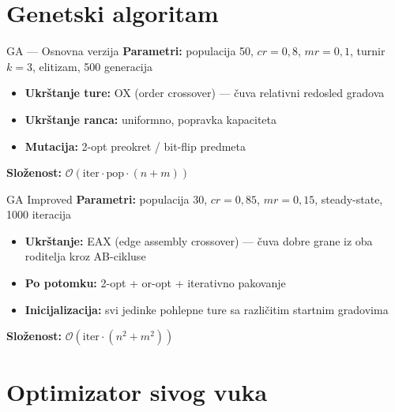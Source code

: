\documentclass[aspectratio=169]{beamer}
\begin{document}
\section{Genetski algoritam}

\begin{frame}{GA --- Osnovna verzija}
  \textbf{Parametri:} populacija 50, $cr = 0{,}8$, $mr = 0{,}1$, turnir $k=3$, elitizam, 500 generacija

  \bigskip
  \begin{itemize}
    \item \textbf{Ukrštanje ture:} OX (order crossover) --- čuva relativni redosled gradova
    \item \textbf{Ukrštanje ranca:} uniformno, popravka kapaciteta
    \item \textbf{Mutacija:} 2-opt preokret / bit-flip predmeta
  \end{itemize}

  \bigskip
  \textbf{Složenost:} $\mathcal{O}(\text{iter} \cdot \text{pop} \cdot (n + m))$
\end{frame}

\begin{frame}{GA Improved}
  \textbf{Parametri:} populacija 30, $cr = 0{,}85$, $mr = 0{,}15$, steady-state, 1000 iteracija

  \bigskip
  \begin{itemize}
    \item \textbf{Ukrštanje:} EAX (edge assembly crossover) ---
      čuva dobre grane iz oba roditelja kroz AB-cikluse
    \item \textbf{Po potomku:} 2-opt + or-opt + iterativno pakovanje
    \item \textbf{Inicijalizacija:} svi jedinke pohlepne ture sa različitim startnim gradovima
  \end{itemize}

  \bigskip
  \textbf{Složenost:} $\mathcal{O}(\text{iter} \cdot (n^2 + m^2))$
\end{frame}

\section{Optimizator sivog vuka}
\end{document}
